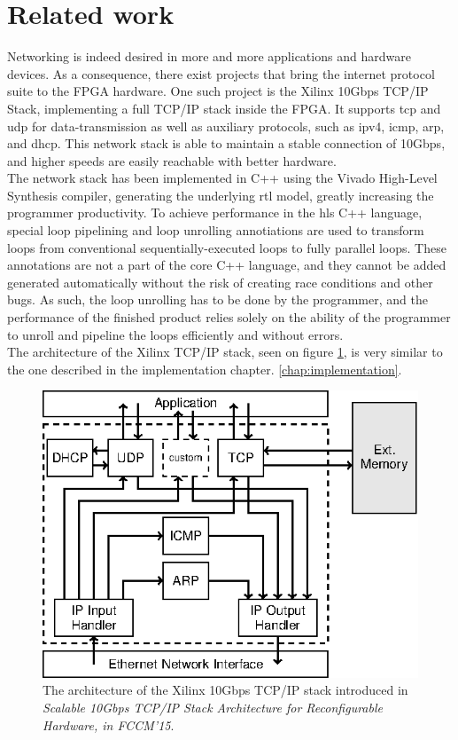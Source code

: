 \section{Related work}
Networking is indeed desired in more and more applications and hardware devices.
As a consequence, there exist projects that bring the internet protocol suite to
the FPGA hardware. One such project is the Xilinx 10Gbps TCP/IP Stack,
implementing a full TCP/IP stack inside the FPGA. It supports \gls{tcp} and
\gls{udp} for data-transmission as well as auxiliary protocols, such as
\gls{ipv4}, \gls{icmp}, \gls{arp}, and \gls{dhcp}.
This network stack is able to maintain a stable connection of 10Gbps, and higher
speeds are easily reachable with better hardware\cite{sidler2015tcp}.\\
The network stack has been implemented in C++ using the Vivado High-Level
Synthesis compiler, generating the underlying \gls{rtl} model, greatly increasing
the programmer productivity.
To achieve performance in the \gls{hls} C++ language, special loop pipelining and
loop unrolling annotiations are used to transform loops from conventional
sequentially-executed loops to fully parallel loops\cite{xilinx_loop_unrolling}.
These annotations are not a part of the core C++ language, and they cannot be
added generated automatically without the risk of creating race conditions and
other bugs. As such, the loop unrolling has to be done by the programmer, and
the performance of the finished product relies solely on the ability of the
programmer to unroll and pipeline the loops efficiently and without errors.\\
The architecture of the Xilinx TCP/IP stack, seen on figure \ref{fig:fccm2015},
is very similar to the one described in the implementation chapter.
\ref{chap:implementation}.
\begin{figure}[h]
\centering
\includegraphics[scale=1]{introduction/fccm2015.eps}
\caption{The architecture of the Xilinx 10Gbps TCP/IP stack introduced in
\textit{Scalable 10Gbps TCP/IP Stack Architecture for Reconfigurable Hardware,
in FCCM’15}\cite{sidler2015tcp}.}
\label{fig:fccm2015}
\end{figure}


